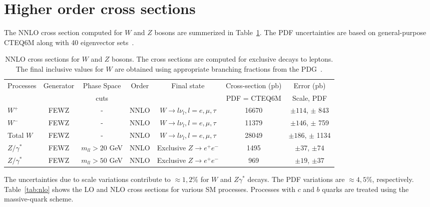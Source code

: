 \section{Higher order cross sections}
\label{sec:results}
The NNLO cross section computed for $W$ and $Z$ bosons are summerized in 
Table~\ref{tab:nnlo}. The PDF uncertainties are based on general-purpose 
CTEQ6M along with 40 eigenvector sets~\cite{cteq6m}.

\vspace{3mm}
\begin{table}[hbt]
\begin{center}
\renewcommand{\arraystretch}{1.2}
\begin{tabular}{|l|c|c|c|c|c|c|}\hline
Processes & Generator & Phase Space& Order & Final state & Cross-section (pb)& Error (pb) \\ 
 &  &  cuts & & & PDF = CTEQ6M & Scale, PDF \\ \hline
$W^+$ & FEWZ & - & NNLO & $W \rightarrow l \nu_l, l=e,\mu,\tau$ & 16670 & $\pm 114$, $\pm$ 843 \\ \hline
$W^-$ & FEWZ & - & NNLO & $W \rightarrow l \nu_l, l=e,\mu,\tau$ & 11379 & $\pm 146$, $\pm$ 759 \\ \hline
Total $W$ & FEWZ & - & NNLO & $W \rightarrow l \nu_l, l=e,\mu,\tau$ & 28049 & $\pm 186$, $\pm$ 1134 \\ \hline
$Z/\gamma^*$ & FEWZ & $m_{ll} > 20$ GeV & NNLO & Exclusive $Z \rightarrow e^+e^-$ & 1495 & $\pm 37$, $\pm 74$ \\ \hline
$Z/\gamma^*$ & FEWZ & $m_{ll} > 50$ GeV & NNLO & Exclusive $Z \rightarrow e^+e^-$ & 969 & $\pm 19$, $\pm 37$ \\ \hline
\end{tabular} 
\caption{NNLO cross sections for $W$ and $Z$ bosons. The cross sections are computed for
exclusive decays to leptons. The final inclusive values for $W$ are obtained using appropriate 
branching fractions from the PDG~\cite{pdg}. \label{tab:nnlo}}
\end{center}
\end{table}

The uncertainties due to scale variations contribute to $\approx 1, 2$\% for 
$W$ and $Z\gamma^*$ decays. The PDF variations are $\approx 4, 5$\%, 
respectively. Table~\ref{tab:nlo} shows the LO and NLO cross sections for 
various SM processes. Processes with $c$ and $b$ quarks are treated using the 
massive-quark scheme.

